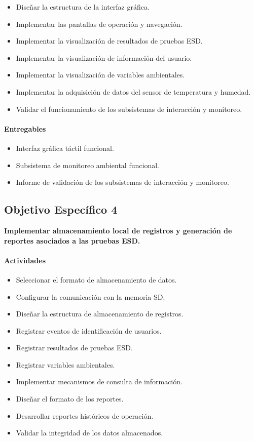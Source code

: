 \begin{itemize}
    \item Diseñar la estructura de la interfaz gráfica.
    \item Implementar las pantallas de operación y navegación.
    \item Implementar la visualización de resultados de pruebas ESD.
    \item Implementar la visualización de información del usuario.
    \item Implementar la visualización de variables ambientales.
    \item Implementar la adquisición de datos del sensor de temperatura y humedad.
    \item Validar el funcionamiento de los subsistemas de interacción y monitoreo.
\end{itemize}

\paragraph{Entregables}

\begin{itemize}
    \item Interfaz gráfica táctil funcional.
    \item Subsistema de monitoreo ambiental funcional.
    \item Informe de validación de los subsistemas de interacción y monitoreo.
\end{itemize}


\subsection{Objetivo Específico 4}

\textbf{Implementar almacenamiento local de registros y generación de reportes asociados a las pruebas ESD.}

\paragraph{Actividades}

\begin{itemize}
    \item Seleccionar el formato de almacenamiento de datos.
    \item Configurar la comunicación con la memoria SD.
    \item Diseñar la estructura de almacenamiento de registros.
    \item Registrar eventos de identificación de usuarios.
    \item Registrar resultados de pruebas ESD.
    \item Registrar variables ambientales.
    \item Implementar mecanismos de consulta de información.
    \item Diseñar el formato de los reportes.
    \item Desarrollar reportes históricos de operación.
    \item Validar la integridad de los datos almacenados.
\end{itemize}

